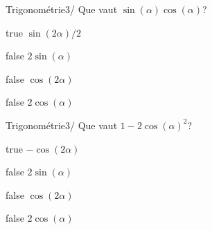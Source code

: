             \begin{question}{47}{Trigonométrie}{3}{/}
            	Que vaut $\sin(\alpha)\cos(\alpha)$?
            \end{question}
            \begin{reponses}
                \item[true] $\sin(2\alpha)/2$
                \item[false] $2\sin(\alpha)$
                \item[false] $\cos(2\alpha)$
                \item[false] $2\cos(\alpha)$
            \end{reponses}
            \begin{question}{47}{Trigonométrie}{3}{/}
            	Que vaut $1-2\cos(\alpha)^2$?
            \end{question}
            \begin{reponses}
                \item[true] $-\cos(2\alpha)$
                \item[false] $2\sin(\alpha)$
                \item[false] $\cos(2\alpha)$
                \item[false] $2\cos(\alpha)$
            \end{reponses}

